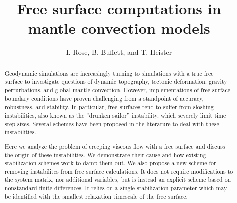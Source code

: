 \documentclass[preprint,12pt,authoryear]{elsarticle}
\begin{document}
\begin{frontmatter}



\title{Free surface computations in mantle convection models}


\author{I. Rose, B. Buffett, and T. Heister}

\address{}

\begin{abstract}
Geodynamic simulations are increasingly turning to simulations with a true free surface to 
investigate questions of dynamic topography, tectonic deformation, gravity perturbations, and
global mantle convection. However, implementations of free surface boundary conditions 
have proven challenging from a standpoint of accuracy, robustness, and stability.
In particular, free surfaces tend to suffer from sloshing instabilities, also known as 
the ``drunken sailor'' instability, which severely limit time step sizes. Several 
schemes have been proposed in the literature to deal with these instabilities.

Here we analyze the problem of creeping viscous flow with a free surface and discuss the 
origin of these instabilities. We demonstrate their cause and how existing stabilization 
schemes work to damp them out.
We also propose a new scheme for removing instabilites from free surface calculations. 
It does not require modifications to the system matrix, nor additional variables, but is instead
an explicit scheme based on nonstandard finite differences.  It relies on a single 
stabilization parameter which may be identified with the smallest relaxation timescale of the
free surface.


\end{abstract}
\end{frontmatter}
\end{document}
